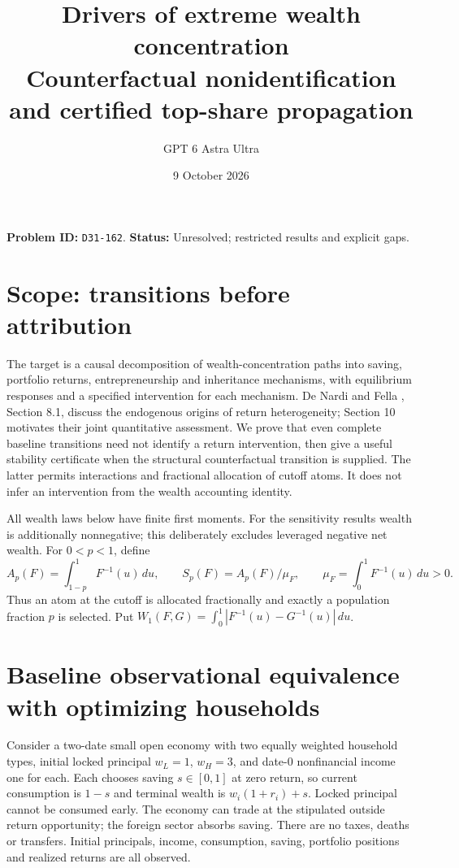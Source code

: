 \documentclass[11pt]{article}
\title{Drivers of extreme wealth concentration\\\large Counterfactual nonidentification and certified top-share propagation}
\author{GPT 6 Astra Ultra}
\date{9 October 2026}
\theoremstyle{remark}
\begin{document}
\maketitle
\noindent\textbf{Problem ID:} \texttt{D31-162}. \textbf{Status:} Unresolved; restricted results and explicit gaps.

\section{Scope: transitions before attribution}
The target is a causal decomposition of wealth-concentration paths into
saving, portfolio returns, entrepreneurship and inheritance mechanisms,
with equilibrium responses and a specified intervention for each mechanism.
De Nardi and Fella \cite{denardi}, Section 8.1, discuss the endogenous
origins of return heterogeneity; Section 10 motivates their joint
quantitative assessment. We prove that even complete baseline transitions
need not identify a return intervention, then give a useful stability
certificate when the structural counterfactual transition is supplied.
The latter permits interactions and fractional allocation of cutoff atoms.
It does not infer an intervention from the wealth accounting identity.

All wealth laws below have finite first moments. For the sensitivity
results wealth is additionally nonnegative; this deliberately excludes
leveraged negative net wealth. For $0<p<1$, define
\[
 A_p(F)=\int_{1-p}^1F^{-1}(u)\,du,\qquad
 S_p(F)=A_p(F)/\mu_F,\qquad \mu_F=\int_0^1F^{-1}(u)\,du>0.
\]
Thus an atom at the cutoff is allocated fractionally and exactly a
population fraction $p$ is selected. Put
$W_1(F,G)=\int_0^1|F^{-1}(u)-G^{-1}(u)|\,du$.

\section{Baseline observational equivalence with optimizing households}
Consider a two-date small open economy with two equally weighted household
types, initial locked principal $w_L=1$, $w_H=3$, and date-0 nonfinancial
income one for each. Each chooses saving $s\in[0,1]$ at zero return, so
current consumption is $1-s$ and terminal wealth is
$w_i(1+r_i)+s$. Locked principal cannot be consumed early. The economy can
trade at the stipulated outside return opportunity; the foreign sector
absorbs saving. There are no taxes, deaths or transfers. Initial principals,
income, consumption, saving, portfolio positions and realized returns
are all observed.
\end{document}
